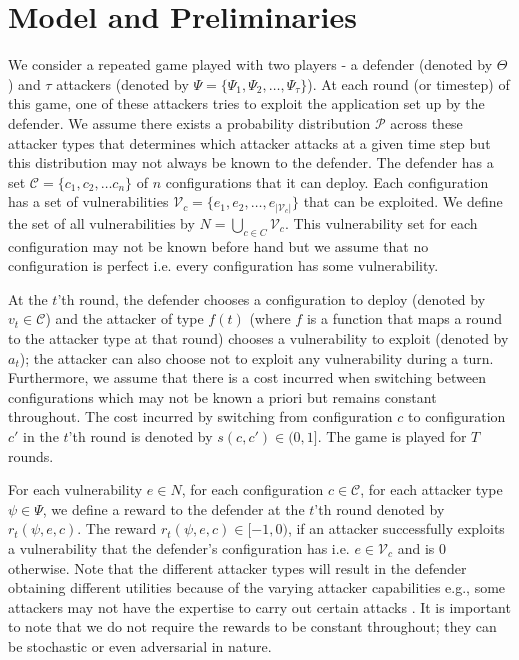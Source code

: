 \documentclass[sigconf]{aamas}  %
\newcommand{\cal}[1]{\mathcal{#1}}
\theoremstyle{definition}
\theoremstyle{definition}
\begin{document}
\section{Model and Preliminaries}\label{sec:model}
We consider a repeated game played with two players - a defender (denoted by $\Theta$) and $\tau$ attackers (denoted by $ \Psi = \{\Psi_1, \Psi_2, \dots, \Psi_\tau\}$). At each round (or timestep) of this game, one of these attackers tries to exploit the application set up by the defender. We assume there exists a probability distribution $\cal P$ across these attacker types that determines which attacker attacks at a given time step but this distribution may not always be known to the defender. The defender has a set $\cal C = \{c_1, c_2, \dots c_n\}$ of $n$ configurations that it can deploy. Each configuration has a set of vulnerabilities $\cal V_c = \{e_1, e_2, \dots, e_{|\cal V_c|}\}$ that can be exploited. We define the set of all vulnerabilities by  $N = \bigcup_{c \in C} \cal V_c$. This vulnerability set for each configuration may not be known before hand but we assume that no configuration is perfect i.e. every configuration has some vulnerability. 

At the $t$'th round, the defender chooses a configuration to deploy (denoted by $v_t \in \cal C$) and the attacker of type $f(t)$ (where $f$ is a function that maps a round to the attacker type at that round) chooses a vulnerability to exploit (denoted by $a_t$); the attacker can also choose not to exploit any vulnerability during a turn. Furthermore, we assume that there is a cost incurred when switching between configurations which may not be known a priori but remains constant throughout. The cost incurred by switching from configuration $c$ to configuration $c'$ in the $t$'th round is denoted by $s(c, c') \in (0,1]$. The game is played for $T$ rounds. 

For each vulnerability $e \in N$, for each configuration $c \in \cal C$, for each attacker type $\psi \in \Psi$, we define a reward to the defender at the $t$'th round denoted by $r_t(\psi, e, c)$. The reward $r_t(\psi, e, c) \in [-1, 0)$, if an attacker successfully exploits a vulnerability that the defender's configuration has i.e. $e \in \cal V_c$ and is $0$ otherwise. Note that the different attacker types will result in the defender obtaining different utilities because of the varying attacker capabilities e.g., some attackers may not have the expertise to carry out certain attacks \citep{sailik2016webappmtd}. It is important to note that we do not require the rewards to be constant throughout; they can be stochastic or even adversarial in nature.
\end{document}

